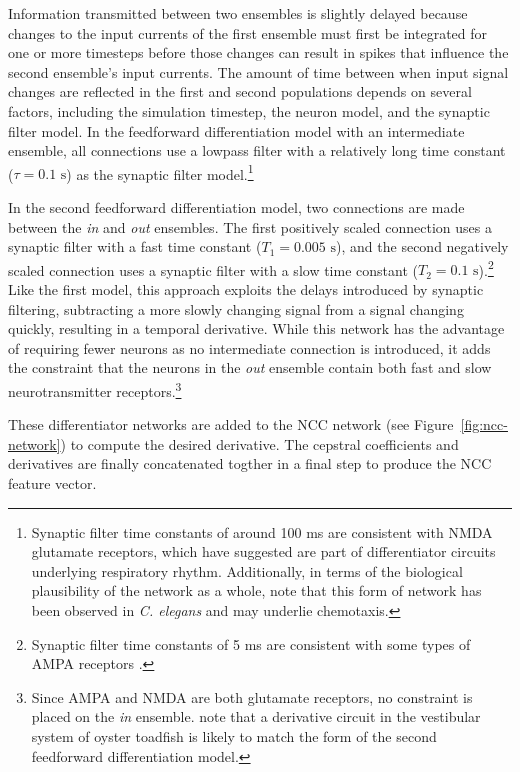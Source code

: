 Information transmitted between two ensembles
is slightly delayed
because changes to the input currents
of the first ensemble
must first be integrated for one or more
timesteps before those changes can result in
spikes that influence
the second ensemble's input currents.
The amount of time between
when input signal changes are reflected
in the first and second populations
depends on several factors,
including the simulation timestep,
the neuron model, and the synaptic filter model.
In the feedforward differentiation model
with an intermediate ensemble,
all connections use a lowpass filter
with a relatively long time constant
($\tau=0.1 \text{ s}$)
as the synaptic filter model.\footnote{
  Synaptic filter time constants of around 100 ms
  are consistent with NMDA glutamate receptors,
  which \citet{young2003} have suggested
  are part of differentiator circuits
  underlying respiratory rhythm.
  Additionally, in terms of
  the biological plausibility of the network as a whole,
  \citet{tripp2010} note that this form of network
  has been observed in \textit{C. elegans}
  \citep{dunn2004} and may underlie chemotaxis.}

In the second feedforward differentiation model,
two connections are made between
the \textit{in} and \textit{out} ensembles.
The first positively scaled connection
uses a synaptic filter with a fast time constant
($T_1=0.005 \text{ s}$),
and the second negatively scaled connection
uses a synaptic filter with a slow time constant
($T_2=0.1 \text{ s}$).\footnote{
  Synaptic filter time constants of 5 ms
  are consistent with some types of
  AMPA receptors \citep{jonas1993}.}
Like the first model,
this approach exploits the delays introduced
by synaptic filtering,
subtracting a more slowly changing signal
from a signal changing quickly,
resulting in a temporal derivative.
While this network has the advantage
of requiring fewer neurons
as no intermediate connection is introduced,
it adds the constraint that
the neurons in the \textit{out} ensemble
contain both fast and slow
neurotransmitter receptors.\footnote{
  Since AMPA and NMDA are both glutamate receptors,
  no constraint is placed on the \textit{in} ensemble.
  \citet{tripp2010} note that a derivative circuit
  in the vestibular system of oyster toadfish
  \citep{holstein2004}
  is likely to match the form of the second
  feedforward differentiation model.}

These differentiator networks
are added to the NCC network
(see Figure~\ref{fig:ncc-network})
to compute the desired derivative.
The cepstral coefficients and derivatives
are finally concatenated togther
in a final step to produce
the NCC feature vector.

